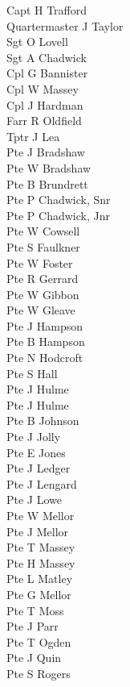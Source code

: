\begin{multicols}{3}
  \small
  \noindent
  Capt H Trafford \\
  Quartermaster J Taylor \\
  Sgt O Lovell \\
  Sgt A Chadwick \\
  Cpl G Bannister \\
  Cpl W Massey \\
  Cpl J Hardman \\
  Farr R Oldfield \\
  Tptr J Lea \\
  Pte J Bradshaw \\
  Pte W Bradshaw \\
  Pte B Brundrett \\
  Pte P Chadwick, Snr \\
  Pte P Chadwick, Jnr \\
  Pte W Cowsell \\
  Pte S Faulkner \\
  Pte W Foster \\
  Pte R Gerrard \\
  Pte W Gibbon \\
  Pte W Gleave \\
  Pte J Hampson \\
  Pte B Hampson \\
  Pte N Hodcroft \\
  Pte S Hall \\
  Pte J Hulme \\
  Pte J Hulme \\
  Pte B Johnson \\
  Pte J Jolly \\
  Pte E Jones \\
  Pte J Ledger \\
  Pte J Lengard \\
  Pte J Lowe \\
  Pte W Mellor \\
  Pte J Mellor \\
  Pte T Massey \\
  Pte H Massey \\
  Pte L Matley \\
  Pte G Mellor \\
  Pte T Moss \\
  Pte J Parr \\
  Pte T Ogden \\
  Pte J Quin \\
  Pte S Rogers \\

\end{multicols}
